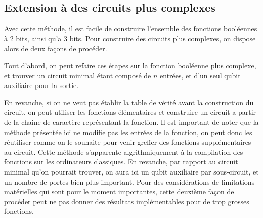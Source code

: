 \documentclass[12pt,a4paper]{article}
\begin{document}
\subsection*{Extension à des circuits plus complexes}
Avec cette méthode, il est facile de construire l'ensemble des fonctions booléennes à 2 bits, ainsi qu'a 3 bits. Pour construire des circuits plus complexes, on dispose alors de deux façons de procéder.

Tout d'abord, on peut refaire ces étapes sur la fonction booléenne plus complexe, et trouver un circuit minimal étant composé de $n$ entrées, et d'un seul qubit auxiliaire pour la sortie.

En revanche, si on ne veut pas établir la table de vérité avant la construction du circuit, on peut utiliser les fonctions élémentaires et construire un circuit a partir de la chaine de caractère représentant la fonction. Il est important de noter que la méthode présentée ici ne modifie pas les entrées de la fonction, on peut donc les réutiliser comme on le souhaite pour venir greffer des fonctions supplémentaires au circuit. Cette méthode s'apparente algrithmiquement à la compilation des fonctions sur les ordinateurs classiques. En revanche, par rapport au circuit minimal qu'on pourrait trouver, on aura ici un qubit auxiliaire par sous-circuit, et un nombre de portes bien plus important. Pour des considérations de limitations matérielles qui sont pour le moment importantes, cette deuxième façon de procéder peut ne pas donner des résultats implémentables pour de trop grosses fonctions.
\end{document}
